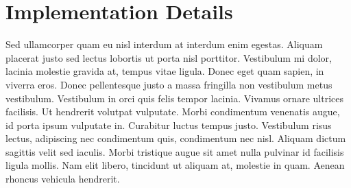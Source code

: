 \section{Implementation Details}

Sed ullamcorper quam eu nisl interdum at interdum enim egestas. Aliquam placerat justo sed lectus lobortis ut porta
nisl porttitor. Vestibulum mi dolor, lacinia molestie gravida at, tempus vitae ligula. Donec eget quam sapien, in
viverra eros. Donec pellentesque justo a massa fringilla non vestibulum metus vestibulum. Vestibulum in orci quis
felis tempor lacinia. Vivamus ornare ultrices facilisis. Ut hendrerit volutpat vulputate. Morbi condimentum venenatis
augue, id porta ipsum vulputate in. Curabitur luctus tempus justo. Vestibulum risus lectus, adipiscing nec
condimentum quis, condimentum nec nisl. Aliquam dictum sagittis velit sed iaculis. Morbi tristique augue sit amet
nulla pulvinar id facilisis ligula mollis. Nam elit libero, tincidunt ut aliquam at, molestie in quam. Aenean rhoncus
vehicula hendrerit.

